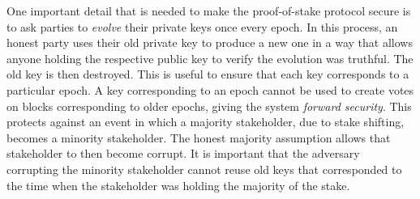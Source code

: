 One important detail that is needed to make the proof-of-stake protocol secure
is to ask parties to \emph{evolve} their private keys once every epoch. In this
process, an honest party uses their old private key to produce a new one in a
way that allows anyone holding the respective public key to verify the evolution
was truthful. The old key is then destroyed. This is useful to ensure that each
key corresponds to a particular epoch. A key corresponding to an epoch cannot be
used to create votes on blocks corresponding to older epochs, giving the system
\emph{forward security}. This protects against an event in which a majority
stakeholder, due to stake shifting, becomes a minority stakeholder. The honest
majority assumption allows that stakeholder to then become corrupt. It is
important that the adversary corrupting the minority stakeholder cannot reuse
old keys that corresponded to the time when the stakeholder was holding the
majority of the stake.
